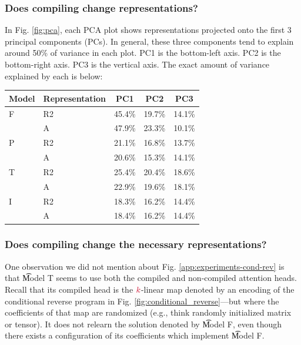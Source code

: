\subsubsection{Does compiling change representations?}

In Fig. \ref{fig:pca}, each PCA plot shows representations projected onto the first 3 principal components (PCs). In general,
these three components tend to explain around 50\% of variance in each plot. PC1 is the bottom-left axis. PC2 is the bottom-right axis.
PC3 is the vertical axis. The exact amount of variance explained by each is below:

\begin{table}[ht]
\centering
\begin{tabular}{llccc}
\toprule
\textbf{Model} & \textbf{Representation} & \textbf{PC1} & \textbf{PC2} & \textbf{PC3} \\
\midrule
F & R2 & 45.4\% & 19.7\% & 14.1\% \\
        & A  & 47.9\% & 23.3\% & 10.1\% \\
\midrule
P & R2 & 21.1\% & 16.8\% & 13.7\% \\
        & A  & 20.6\% & 15.3\% & 14.1\% \\
\midrule
T & R2 & 25.4\% & 20.4\% & 18.6\% \\
        & A  & 22.9\% & 19.6\% & 18.1\% \\
\midrule
I & R2 & 18.3\% & 16.2\% & 14.4\% \\
        & A  & 18.4\% & 16.2\% & 14.4\% \\
\bottomrule
\end{tabular}
\end{table}

\subsubsection{Does compiling change the necessary representations?}

One observation we did not mention about Fig. \ref{app:experiments-cond-rev} is that \t{Model T} seems to use both the compiled and non-compiled 
attention heads. Recall that its compiled head is the $\rd{k}$-linear map denoted by an encoding of the
conditional reverse program in Fig. \ref{fig:conditional_reverse}---but where the coefficients of that map
are randomized (e.g., think randomly initialized matrix or tensor). It does not relearn the solution
denoted by \t{Model F}, even though there exists a configuration of its coefficients which implement \t{Model F}.

